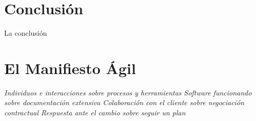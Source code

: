 \documentclass[journal]{IEEEtran}
\begin{document}




\section{Conclusión}
La conclusión






%


\appendices
\section{El Manifiesto Ágil}\label{apendice:a}

\begin{center}
\emph{Individuos e interacciones sobre procesos y herramientas
Software funcionando sobre documentación extensiva
Colaboración con el cliente sobre negociación contractual
Respuesta ante el cambio sobre seguir un plan}
\end{center}
\end{document}
